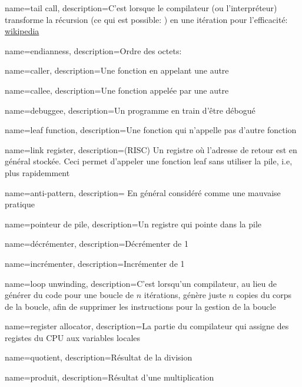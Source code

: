 {
  name={tail call},
  description={C'est lorsque le compilateur (ou l'interpréteur) transforme la récursion (ce qui est possible: )
  en une itération pour l'efficacité: \href{http://go.yurichev.com/17105}{wikipedia}}
}

{
  name=endianness,
  description={Ordre des octets: }
}

{
  name=caller,
  description={Une fonction en appelant une autre}
}

{
  name=callee,
  description={Une fonction appelée par une autre}
}

{
  name=debuggee,
  description={Un programme en train d'être débogué}
}

{
  name=leaf function,
  description={Une fonction qui n'appelle pas d'autre fonction}
}

{
  name=link register,
  description=(RISC) Un registre où l'adresse de retour est en général stockée. Ceci permet
  d'appeler une fonction leaf sans utiliser la pile, i.e, plus rapidemment
}

{
  name=anti-pattern,
  description=
  En général considéré comme une mauvaise pratique
}

{
  name=pointeur de pile,
  description={Un registre qui pointe dans la pile}
}

{
  name=décrémenter,
  description=Décrémenter de 1
}

{
  name=incrémenter,
  description=Incrémenter de 1
}

{
  name=loop unwinding,
  description={C'est lorsqu'un compilateur, au lieu de générer du code pour une boucle de
  $n$ itérations, génère juste $n$ copies du corps de la boucle, afin de supprimer
  les instructions pour la gestion de la boucle}
}

{
  name=register allocator,
  description={La partie du compilateur qui assigne des registes du CPU aux variables locales}
}

{
  name=quotient,
  description={Résultat de la division}
}

{
  name=produit,
  description={Résultat d'une multiplication}
}

